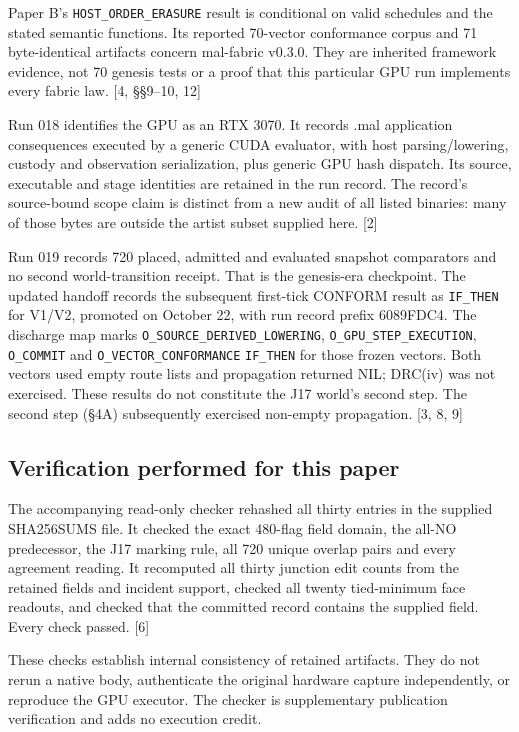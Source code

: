 \documentclass[
]{article}
\begin{document}
Paper B's \nolinkurl{HOST_ORDER_ERASURE} result is conditional on valid
schedules and the stated semantic functions. Its reported 70-vector
conformance corpus and 71 byte-identical artifacts concern mal-fabric
v0.3.0. They are inherited framework evidence, not 70 genesis tests or a
proof that this particular GPU run implements every fabric law. {[}4,
§§9--10, 12{]}

Run 018 identifies the GPU as an RTX 3070. It records .mal application
consequences executed by a generic CUDA evaluator, with host
parsing/lowering, custody and observation serialization, plus generic
GPU hash dispatch. Its source, executable and stage identities are
retained in the run record. The record's source-bound scope claim is
distinct from a new audit of all listed binaries: many of those bytes
are outside the artist subset supplied here. {[}2{]}

Run 019 records 720 placed, admitted and evaluated snapshot comparators
and no second world-transition receipt. That is the genesis-era
checkpoint. The updated handoff records the subsequent first-tick
CONFORM result as \nolinkurl{IF_THEN} for V1/V2, promoted on October 22,
with run record prefix 6089FDC4. The discharge map marks
\nolinkurl{O_SOURCE_DERIVED_LOWERING}, \nolinkurl{O_GPU_STEP_EXECUTION},
\nolinkurl{O_COMMIT} and \nolinkurl{O_VECTOR_CONFORMANCE}
\nolinkurl{IF_THEN} for those frozen vectors. Both vectors used empty
route lists and propagation returned NIL; DRC(iv) was not exercised.
These results do not constitute the J17 world's second step. The second
step (§4A) subsequently exercised non-empty propagation. {[}3, 8, 9{]}

\subsection{Verification performed for this
paper}\label{verification-performed-for-this-paper}

The accompanying read-only checker rehashed all thirty entries in the
supplied SHA256SUMS file. It checked the exact 480-flag field domain,
the all-NO predecessor, the J17 marking rule, all 720 unique overlap
pairs and every agreement reading. It recomputed all thirty junction
edit counts from the retained fields and incident support, checked all
twenty tied-minimum face readouts, and checked that the committed record
contains the supplied field. Every check passed. {[}6{]}

These checks establish internal consistency of retained artifacts. They
do not rerun a native body, authenticate the original hardware capture
independently, or reproduce the GPU executor. The checker is
supplementary publication verification and adds no execution credit.
\end{document}
